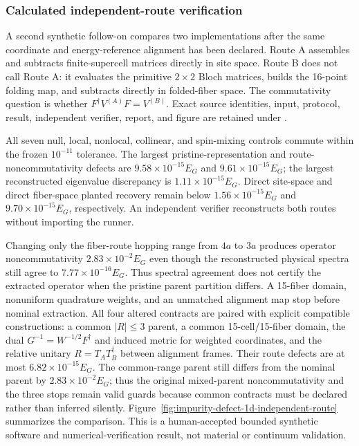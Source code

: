 \subsubsection{Calculated independent-route verification}

A second synthetic follow-on compares two implementations after the same
coordinate and energy-reference alignment has been declared. Route A assembles
and subtracts finite-supercell matrices directly in site space. Route B does
not call Route A: it evaluates the primitive $2\times2$ Bloch matrices, builds
the 16-point folding map, and subtracts directly in folded-fiber space. The
commutativity question is whether $F^\dagger V^{(A)}F=V^{(B)}$. Exact source
identities, input, protocol, result, independent verifier, report, and figure
are retained under
.

All seven null, local, nonlocal, collinear, and spin-mixing controls commute
within the frozen $10^{-11}$ tolerance. The largest pristine-representation
and route-noncommutativity defects are $9.58\times10^{-15}E_G$ and
$9.61\times10^{-15}E_G$; the largest reconstructed eigenvalue discrepancy is
$1.11\times10^{-15}E_G$. Direct site-space and direct fiber-space planted
recovery remain below $1.56\times10^{-15}E_G$ and
$9.70\times10^{-15}E_G$, respectively. An independent verifier reconstructs
both routes without importing the runner.

Changing only the fiber-route hopping range from $4a$ to $3a$ produces
operator noncommutativity $2.83\times10^{-2}E_G$ even though the reconstructed
physical spectra still agree to $7.77\times10^{-16}E_G$. Thus spectral
agreement does not certify the extracted operator when the pristine parent
partition differs. A 15-fiber domain, nonuniform quadrature weights, and an
unmatched alignment map stop before nominal extraction. All four altered
contracts are paired with explicit compatible constructions: a common
$|R|\leq3$ parent, a common 15-cell/15-fiber domain, the dual
$G^{-1}=W^{-1/2}F^\dagger$ and induced metric for weighted coordinates, and the
relative unitary $R=T_AT_B^\dagger$ between alignment frames. Their route
defects are at most $6.82\times10^{-15}E_G$. The common-range parent still
differs from the nominal parent by $2.83\times10^{-2}E_G$; thus the original
mixed-parent noncommutativity and the three stops remain valid guards because
common contracts must be declared rather than inferred silently.
Figure~\ref{fig:impurity-defect-1d-independent-route} summarizes the comparison.
This is a human-accepted bounded synthetic software and numerical-verification
result, not material or continuum validation.

